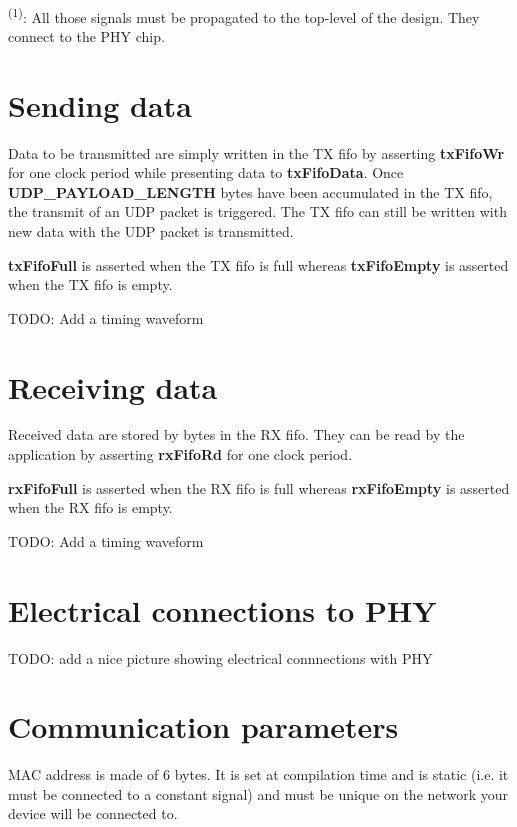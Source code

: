 \documentclass[a4paper]{hitec}
\newcommand{\signal}[1]{\textbf{#1}}
\begin{document}
\ \\
\textsuperscript{(1)}: All those signals must be propagated to the top-level of the design. They connect to the PHY chip.



\section{Sending data}

Data to be transmitted are simply written in the TX fifo by asserting \signal{txFifoWr} for one clock period while presenting data to \signal{txFifoData}. Once \signal{UDP\_PAYLOAD\_LENGTH} bytes have been accumulated in the TX fifo, the transmit of an UDP packet is triggered. The TX fifo can still be written with new data with the UDP packet is transmitted.

\signal{txFifoFull} is asserted when the TX fifo is full whereas \signal{txFifoEmpty} is asserted when the TX fifo is empty.

TODO: Add a timing waveform



\section{Receiving data}

Received data are stored by bytes in the RX fifo. They can be read by the application by asserting \signal{rxFifoRd} for one clock period.

\signal{rxFifoFull} is asserted when the RX fifo is full whereas \signal{rxFifoEmpty} is asserted when the RX fifo is empty.

TODO: Add a timing waveform



\section{Electrical connections to PHY}

TODO: add a nice picture showing electrical connnections with PHY



\section{Communication parameters}

MAC address is made of 6 bytes. It is set at compilation time and is static (i.e. it must be connected to a constant signal) and must be unique on the network your device will be connected to.
\end{document}
